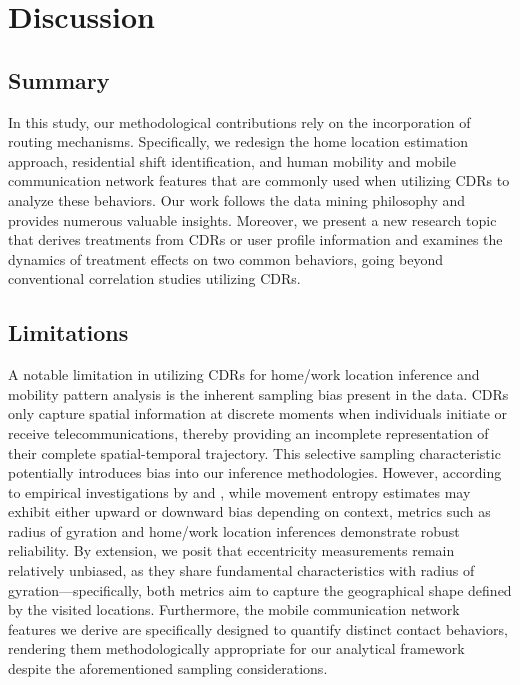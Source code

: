 
\chapter{Discussion}
\section{Summary}
In this study, our methodological contributions rely on the incorporation of routing mechanisms.
Specifically, we redesign the home location estimation approach, residential shift identification, and human mobility and mobile communication network features that are commonly used when utilizing CDRs to analyze these behaviors.
Our work follows the data mining philosophy and provides numerous valuable insights.
Moreover, we present a new research topic that derives treatments from CDRs or user profile information and examines the dynamics of treatment effects on two common behaviors, going beyond conventional correlation studies utilizing CDRs.

\section{Limitations}
A notable limitation in utilizing CDRs for home/work location inference and mobility pattern analysis is the inherent sampling bias present in the data.
CDRs only capture spatial information at discrete moments when individuals initiate or receive telecommunications, thereby providing an incomplete representation of their complete spatial-temporal trajectory.
This selective sampling characteristic potentially introduces bias into our inference methodologies.
However, according to empirical investigations by \cite{ranjan2012call} and \cite{zhao2016understanding}, while movement entropy estimates may exhibit either upward or downward bias depending on context, metrics such as radius of gyration and home/work location inferences demonstrate robust reliability.
By extension, we posit that eccentricity measurements remain relatively unbiased, as they share fundamental characteristics with radius of gyration—specifically, both metrics aim to capture the geographical shape defined by the visited locations.
Furthermore, the mobile communication network features we derive are specifically designed to quantify distinct contact behaviors, rendering them methodologically appropriate for our analytical framework despite the aforementioned sampling considerations.


